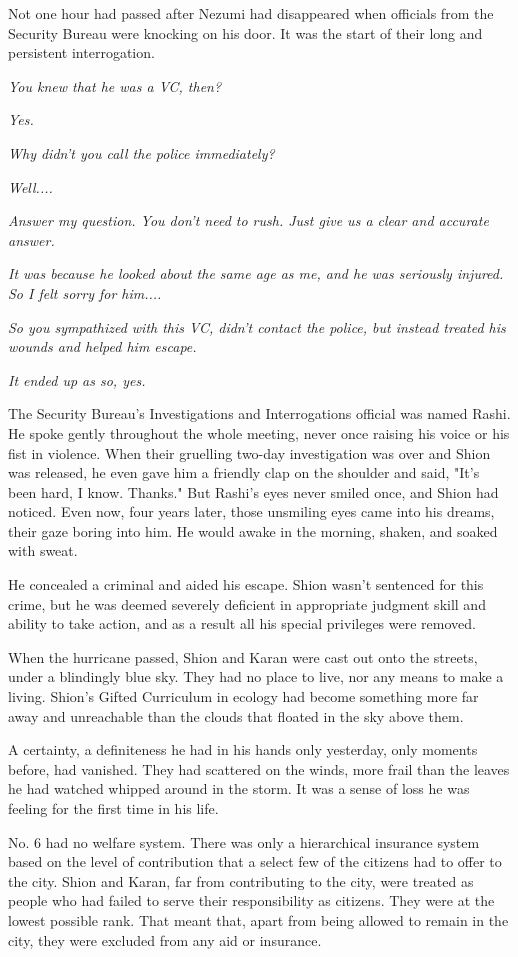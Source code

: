 Not one hour had passed after Nezumi had disappeared when officials from
the Security Bureau were knocking on his door. It was the start of their
long and persistent interrogation.

\emph{You knew that he was a VC, then?}

\emph{Yes.}

\emph{Why didn't you call the police immediately?}

\emph{Well....}

\emph{Answer my question. You don't need to rush. Just give us a clear and
	accurate answer.}

\emph{It was because he looked about the same age as me, and he was seriously
	injured. So I felt sorry for him....}

\emph{So you sympathized with this VC, didn't contact the police, but instead
	treated his wounds and helped him escape.}

\emph{It ended up as so, yes.}

The Security Bureau's Investigations and Interrogations official was
named Rashi. He spoke gently throughout the whole meeting, never once
raising his voice or his fist in violence. When their gruelling two-day
investigation was over and Shion was released, he even gave him a
friendly clap on the shoulder and said, "It's been hard, I know.
Thanks." But Rashi's eyes never smiled once, and Shion had noticed. Even
now, four years later, those unsmiling eyes came into his dreams, their
gaze boring into him. He would awake in the morning, shaken, and soaked
with sweat.

He concealed a criminal and aided his escape. Shion wasn't sentenced for
this crime, but he was deemed severely deficient in appropriate judgment
skill and ability to take action, and as a result all his special
privileges were removed.

When the hurricane passed, Shion and Karan were cast out onto the
streets, under a blindingly blue sky. They had no place to live, nor any
means to make a living. Shion's Gifted Curriculum in ecology had become
something more far away and unreachable than the clouds that floated in
the sky above them.

A certainty, a definiteness he had in his hands only yesterday, only
moments before, had vanished. They had scattered on the winds, more
frail than the leaves he had watched whipped around in the storm. It was
a sense of loss he was feeling for the first time in his life.

No. 6 had no welfare system. There was only a hierarchical insurance
system based on the level of contribution that a select few of the
citizens had to offer to the city. Shion and Karan, far from
contributing to the city, were treated as people who had failed to serve
their responsibility as citizens. They were at the lowest possible rank.
That meant that, apart from being allowed to remain in the city, they
were excluded from any aid or insurance.

